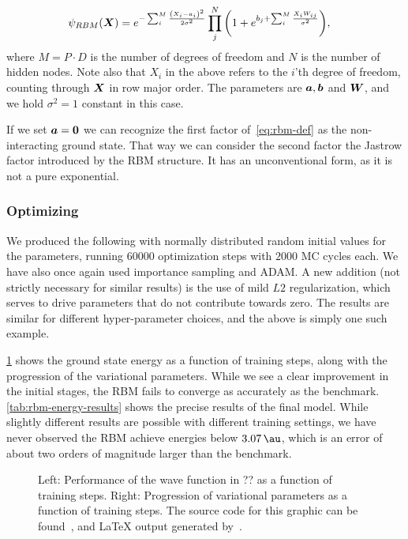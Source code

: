 \documentclass[Thesis.tex]{subfiles}
\begin{document}
\begin{align}
  \label{eq:rbm-def}
  \psi_{RBM}(\bm{X}) &=
        e^{-\sum_i^{M} \frac{\qty(X_i-a_i)^2}{2\sigma^2}}
        \prod_j^N \qty(1 + e^{b_j+\sum_i^M \frac{X_iW_{ij}}{\sigma^2}}),
\end{align}
where $M = P\cdot D$ is the number of degrees of freedom and $N$ is the number
of hidden nodes. Note also that $X_i$ in the above refers to the $i$'th degree
of freedom, counting through $\bm{X}$ in row major order. The parameters are
$\bm{a}, \bm{b}$ and $\bm{W}$, and we hold $\sigma^2=1$ constant in this case.

If we set $\bm{a} = \bm{0}$ we can recognize the first factor of~\cref{eq:rbm-def}
as the non-interacting ground state. That way we can consider the second factor
the Jastrow factor introduced by the RBM structure. It has an unconventional
form, as it is not a pure exponential.


\subsubsection{Optimizing}

We produced the following with normally distributed random
initial values for the parameters, running $\num{60000}$ optimization steps with
$\num{2000}$ MC cycles each. We have also once again used importance sampling
and ADAM\@. A new addition (not strictly necessary for similar results) is the use
of mild $L2$ regularization, which serves to drive parameters that do not
contribute towards zero. The results are similar for different hyper-parameter
choices, and the above is simply one such example.

\cref{fig:QD-rbm-training} shows the ground state energy as a function of
training steps, along with the progression of the variational
parameters. While we see a clear improvement in the initial stages, the RBM
fails to converge as accurately as the benchmark. \cref{tab:rbm-energy-results}
shows the precise results of the final model. While slightly different results
are possible with different training settings, we have never observed the RBM
achieve energies below $\SI{3.07}{\au}$, which is an error of about two orders
of magnitude larger than the benchmark.



\begin{figure}[h]
   \centering
    \resizebox{\linewidth}{!}{%
        
    }
    \caption{\label{fig:QD-rbm-training}Left: Performance of the
      wave function in ?? as a function of
      training steps. Right: Progression of variational parameters as a function
      of training steps. The source code for this graphic can be found~\cite[TODO: Add
    path]{MS-thesis-repository}, and \LaTeX{} output generated
    by~\cite{nico_schlomer_2018_1173090}.}
\end{figure}
\end{document}
